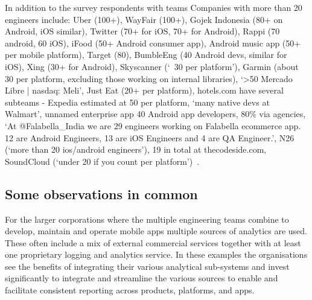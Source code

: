 In addition to the survey respondents with teams Companies with more than 20 engineers include: Uber (100+), %
WayFair (100+), Gojek Indonesia (80+ on Android, iOS similar), %
Twitter (70+ for iOS, 70+ for Android), Rappi (70 android, 60 iOS), iFood (50+ Android consumer app), Android music app (50+ per mobile platform), Target (80), BumbleEng (40 Android devs, similar for iOS), Xing (30+ for Android), Skyscanner (`~30 per platform'), Garmin (about 30 per platform, excluding those working on internal libraries), `>50 Mercado Libre | nasdaq: Meli', Just Eat (20+ per platform), hotels.com have several subteams - Expedia estimated at 50 per platform, `many native devs at Walmart', unnamed enterprise app 40 Android app developers, 80\% via agencies, `At 
@Falabella\_India we are 29 engineers working on Falabella ecommerce app. 12 are Android Engineers, 13 are iOS Engineers and 4 are QA Engineer.', N26 (`more than 20 ios/android engineers'), 19 in total at thecodeside.com, SoundCloud (`under 20 if you count per platform')~\citep{gergelyorosz2021_twitter_mobile_app_poll}.


\subsection{Some observations in common}
For the larger corporations where the multiple engineering teams combine to develop, maintain and operate mobile apps multiple sources of analytics are used. These often include a mix of external commercial services together with at least one proprietary logging and analytics service. In these examples the organisations see the benefits of integrating their various analytical sub-systems and invest significantly to integrate and streamline the various sources to enable and facilitate consistent reporting across products, platforms, and apps.

